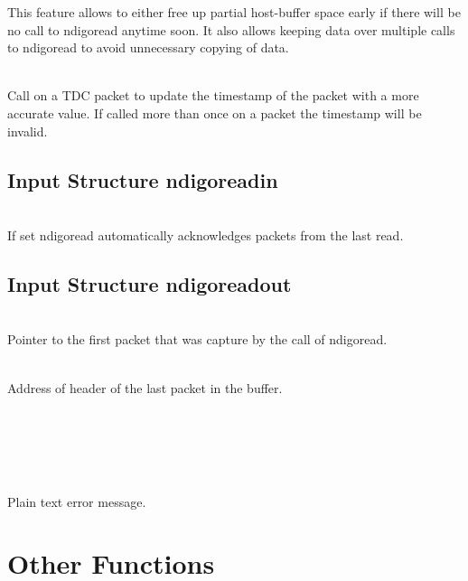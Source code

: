         This feature allows to either free up partial host-buffer space early if there will be no call to \textsf{ndigo\tu read} anytime soon. It also allows keeping data over multiple calls to \textsf{ndigo\tu read} to avoid unnecessary copying of data.\par

         \\
        Call on a TDC packet to update the timestamp of the packet with a more accurate value. If called more than once on a packet the timestamp will be invalid.

        \subsection{Input Structure ndigo\tu read\tu in}

            \\
            If set \textsf{ndigo\tu read} automatically acknowledges packets from the last read.

        \subsection{Input Structure ndigo\tu read\tu out}

            \\
            Pointer to the first packet that was capture by the call of \textsf{ndigo\tu read}.\par

            \\
            Address of header of the last packet in the buffer.\par

            \\
            \\
            \\
            \par

            \\
            Plain text error message.

    \section{Other Functions}
